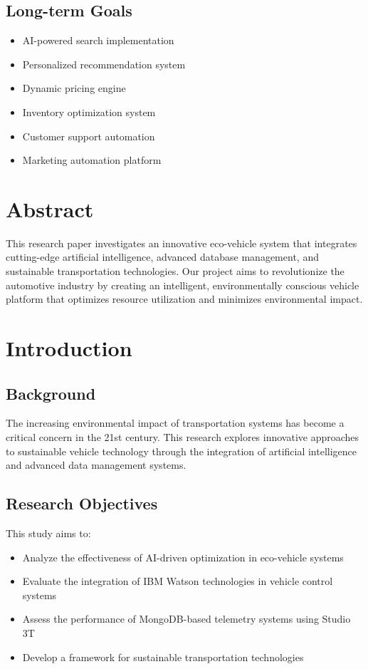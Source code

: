 \documentclass[12pt,a4paper]{article}
\begin{document}
\subsection{Long-term Goals}
\begin{itemize}
    \item AI-powered search implementation
    \item Personalized recommendation system
    \item Dynamic pricing engine
    \item Inventory optimization system
    \item Customer support automation
    \item Marketing automation platform
\end{itemize}

\section{Abstract}
This research paper investigates an innovative eco-vehicle system that integrates cutting-edge artificial intelligence, advanced database management, and sustainable transportation technologies. Our project aims to revolutionize the automotive industry by creating an intelligent, environmentally conscious vehicle platform that optimizes resource utilization and minimizes environmental impact.

\section{Introduction}
\subsection{Background}
The increasing environmental impact of transportation systems has become a critical concern in the 21st century. This research explores innovative approaches to sustainable vehicle technology through the integration of artificial intelligence and advanced data management systems.

\subsection{Research Objectives}
This study aims to:
\begin{itemize}
    \item Analyze the effectiveness of AI-driven optimization in eco-vehicle systems
    \item Evaluate the integration of IBM Watson technologies in vehicle control systems
    \item Assess the performance of MongoDB-based telemetry systems using Studio 3T
    \item Develop a framework for sustainable transportation technologies
\end{itemize}
\end{document}
